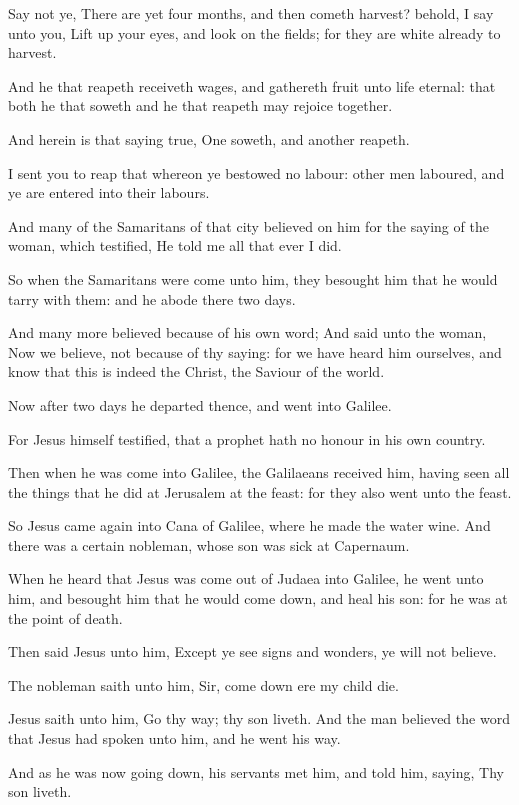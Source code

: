 \verse Say not ye, There are yet four months, and then cometh harvest?  behold, I say unto you, Lift up your eyes, and look on the fields; for they are white already to harvest.

\verse And he that reapeth receiveth wages, and gathereth fruit unto life eternal: that both he that soweth and he that reapeth may rejoice together.

\verse And herein is that saying true, One soweth, and another reapeth.

\verse I sent you to reap that whereon ye bestowed no labour: other men laboured, and ye are entered into their labours.

\verse And many of the Samaritans of that city believed on him for the saying of the woman, which testified, He told me all that ever I did.

\verse So when the Samaritans were come unto him, they besought him that he would tarry with them: and he abode there two days.

\verse And many more believed because of his own word; \verse And said unto the woman, Now we believe, not because of thy saying: for we have heard him ourselves, and know that this is indeed the Christ, the Saviour of the world.

\verse Now after two days he departed thence, and went into Galilee.

\verse For Jesus himself testified, that a prophet hath no honour in his own country.

\verse Then when he was come into Galilee, the Galilaeans received him, having seen all the things that he did at Jerusalem at the feast: for they also went unto the feast.

\verse So Jesus came again into Cana of Galilee, where he made the water wine. And there was a certain nobleman, whose son was sick at Capernaum.

\verse When he heard that Jesus was come out of Judaea into Galilee, he went unto him, and besought him that he would come down, and heal his son: for he was at the point of death.

\verse Then said Jesus unto him, Except ye see signs and wonders, ye will not believe.

\verse The nobleman saith unto him, Sir, come down ere my child die.

\verse Jesus saith unto him, Go thy way; thy son liveth. And the man believed the word that Jesus had spoken unto him, and he went his way.

\verse And as he was now going down, his servants met him, and told him, saying, Thy son liveth.

